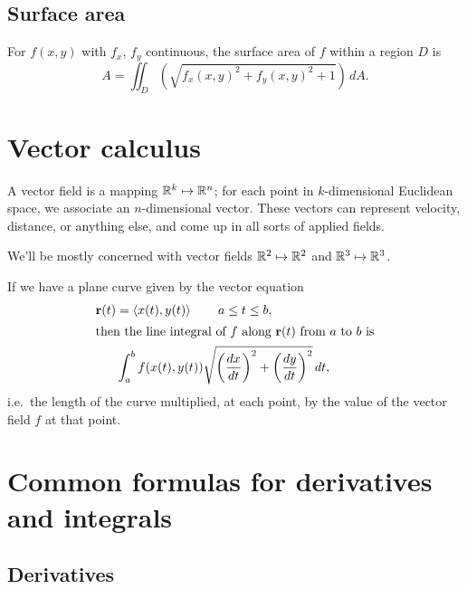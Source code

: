 \documentclass[knowledge]{rbt-mathnotes}
\begin{document}
\section{Surface area}

For $f(x,y)$ with $f_x$, $f_y$ continuous, the surface area of $f$ within
a region $D$ is
\[A = \iint_D \left(\sqrt{f_x(x,y)^2 + f_y(x,y)^2 + 1}\right) \,dA.\]


\chapter{Vector calculus}
A vector field is a mapping $\mathbb{R}^k \mapsto \mathbb{R}^n$; for each point in
$k$-dimensional Euclidean space, we associate an $n$-dimensional vector.
These vectors can represent velocity, distance, or anything else, and come
up in all sorts of applied fields.

We'll be mostly concerned with vector fields $\mathbb{R}^2\mapsto\mathbb{R}^2$ and
$\mathbb{R}^3\mapsto\mathbb{R}^3$.

If we have a plane curve given by the vector equation
\begin{alignat*}{1}
  \vec r(t) &= \left< x(t), y(t) \right> \qquad a \le t \le b, \\
\intertext{then the line integral of $f$ along $\vec r(t)$ from $a$ to $b$
is}
  & \int_a^b f(x(t), y(t)) \sqrt{{\left(\dd[x]{t}\right)}^2 +
  {\left(\dd[y]{t}\right)}^2}\,dt,
\end{alignat*}
i.e.\ the length of the curve multiplied, at each point, by the value of the
vector field $f$ at that point.


\appendix
\chapter{Common formulas for derivatives and integrals}
\backmatter
\section{Derivatives}
\end{document}
